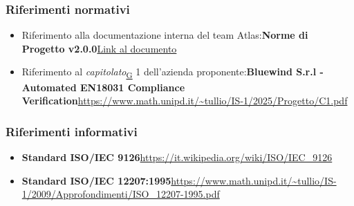 \documentclass[a4paper,12pt]{article}
\begin{document}
{{        \subsubsection{Riferimenti normativi}{
            \begin{itemize}
                \item Riferimento alla documentazione interna del team Atlas:\newline \textbf{Norme di Progetto v2.0.0}\newline \href{https://atlasteam9.github.io/Atlas/docs/PB/documenti/interni/Norme%20di%20Progetto.pdf}{Link al documento}
                \item Riferimento al \textit{capitolato}\textsubscript{\href{https://atlasteam9.github.io/Atlas/glossario.html\#Capitolato}{G}} 1 dell'azienda proponente:\newline \textbf{Bluewind S.r.l - Automated EN18031 Compliance Verification}\newline \url{https://www.math.unipd.it/~tullio/IS-1/2025/Progetto/C1.pdf}
            \end{itemize}
        }

        \subsubsection{Riferimenti informativi}{
            \begin{itemize}
                \item \textbf{Standard ISO/IEC 9126}\newline \url{https://it.wikipedia.org/wiki/ISO/IEC_9126}
                \item \textbf{Standard ISO/IEC 12207:1995}\newline \url{https://www.math.unipd.it/~tullio/IS-1/2009/Approfondimenti/ISO_12207-1995.pdf}
            \end{itemize}
            
}}}
\end{document}
